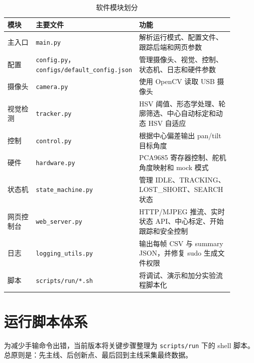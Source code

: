 \documentclass[
  oneside,
  degree=bachelor,
  field=science,
  fullwidthstop=circle,
  fontset=windows,
  times=false,
  minted=false,
  biblatex=false,
  algo=algpseudocode,
]{tongjithesis}
\newcommand{\code}[1]{\texttt{#1}}
\begin{document}
\begin{table}[htbp]
  \centering
  \caption{软件模块划分}
  \label{tab:modules}
  \footnotesize
  \setlength{\tabcolsep}{4pt}
  \begin{tabular}{p{0.14\linewidth}p{0.31\linewidth}p{0.45\linewidth}}
    \toprule
    模块 & 主要文件 & 功能 \\
    \midrule
    主入口 & \code{main.py} & 解析运行模式、配置文件、跟踪后端和网页参数 \\
    配置 & \code{config.py}，\code{configs/default\_config.json} & 管理摄像头、视觉、控制、状态机、日志和硬件参数 \\
    摄像头 & \code{camera.py} & 使用 OpenCV 读取 USB 摄像头 \\
    视觉检测 & \code{tracker.py} & HSV 阈值、形态学处理、轮廓筛选、中心自动标定和动态 HSV 自适应 \\
    控制 & \code{control.py} & 根据中心偏差输出 pan/tilt 目标角度 \\
    硬件 & \code{hardware.py} & PCA9685 寄存器控制、舵机角度映射和 mock 模式 \\
    状态机 & \code{state\_machine.py} & 管理 IDLE、TRACKING、LOST\_SHORT、SEARCH 状态 \\
    网页控制台 & \code{web\_server.py} & HTTP/MJPEG 推流、实时状态 API、中心标定、开始跟踪和安全控制 \\
    日志 & \code{logging\_utils.py} & 输出每帧 CSV 与 summary JSON，并修复 sudo 生成文件权限 \\
    脚本 & \code{scripts/run/*.sh} & 将调试、演示和加分实验流程脚本化 \\
    \bottomrule
  \end{tabular}
\end{table}

\section{运行脚本体系}

为减少手输命令出错，当前版本将关键步骤整理为 \code{scripts/run} 下的 shell 脚本。总原则是：先主线、后创新点、最后回到主线采集最终数据。
\end{document}
